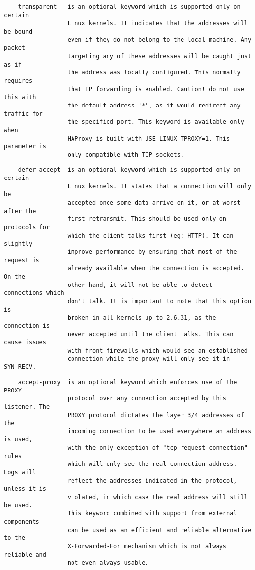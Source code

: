 \begin{verbatim}
    transparent   is an optional keyword which is supported only on certain
                  Linux kernels. It indicates that the addresses will be bound
                  even if they do not belong to the local machine. Any packet
                  targeting any of these addresses will be caught just as if
                  the address was locally configured. This normally requires
                  that IP forwarding is enabled. Caution! do not use this with
                  the default address '*', as it would redirect any traffic for
                  the specified port. This keyword is available only when
                  HAProxy is built with USE_LINUX_TPROXY=1. This parameter is
                  only compatible with TCP sockets.
\end{verbatim}

\begin{verbatim}
    defer-accept  is an optional keyword which is supported only on certain
                  Linux kernels. It states that a connection will only be
                  accepted once some data arrive on it, or at worst after the
                  first retransmit. This should be used only on protocols for
                  which the client talks first (eg: HTTP). It can slightly
                  improve performance by ensuring that most of the request is
                  already available when the connection is accepted. On the
                  other hand, it will not be able to detect connections which
                  don't talk. It is important to note that this option is
                  broken in all kernels up to 2.6.31, as the connection is
                  never accepted until the client talks. This can cause issues
                  with front firewalls which would see an established
                  connection while the proxy will only see it in SYN_RECV.
\end{verbatim}

\begin{verbatim}
    accept-proxy  is an optional keyword which enforces use of the PROXY
                  protocol over any connection accepted by this listener. The
                  PROXY protocol dictates the layer 3/4 addresses of the
                  incoming connection to be used everywhere an address is used,
                  with the only exception of "tcp-request connection" rules
                  which will only see the real connection address. Logs will
                  reflect the addresses indicated in the protocol, unless it is
                  violated, in which case the real address will still be used.
                  This keyword combined with support from external components
                  can be used as an efficient and reliable alternative to the
                  X-Forwarded-For mechanism which is not always reliable and
                  not even always usable.
\end{verbatim}


